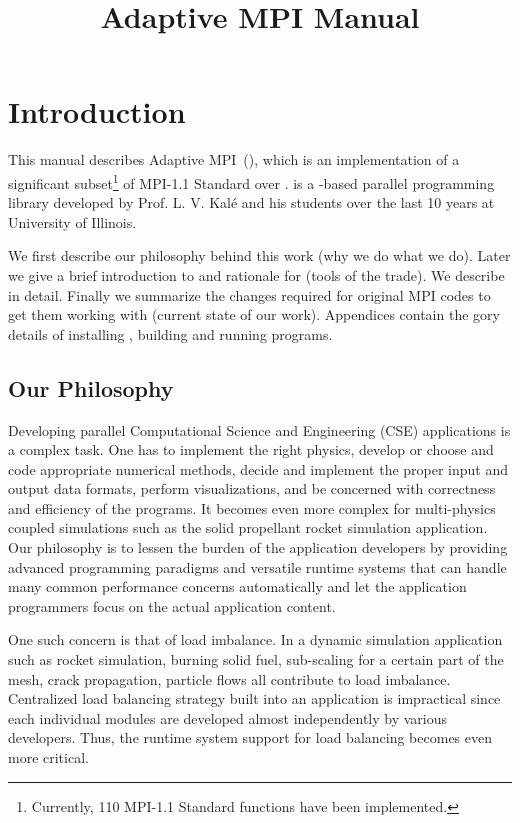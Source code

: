 \documentclass[10pt]{article}
\title{Adaptive MPI Manual}
\begin{document}
\maketitle

\section{Introduction}

This manual describes Adaptive MPI~(\ampi{}), which is an implementation of a
significant subset\footnote{Currently, 110 MPI-1.1 Standard functions have 
been implemented.} of MPI-1.1 Standard over \charmpp{}. \charmpp{} is a
\CC{}-based parallel programming library developed by Prof. L. V. Kal\'{e} 
and his students over the last 10 years at University of Illinois.

We first describe our philosophy behind this work (why we do what we do).
Later we give a brief introduction to \charmpp{} and rationale for \ampi{}
(tools of the trade). We describe \ampi{} in detail. Finally we summarize the
changes required for original MPI codes to get them working with \ampi{}
(current state of our work). Appendices contain the gory details of installing
\ampi{}, building and running \ampi{} programs.

\subsection{Our Philosophy}

Developing parallel Computational Science and Engineering (CSE) applications is
a complex task. One has to implement the right physics, develop or choose and
code appropriate numerical methods, decide and implement the proper input and
output data formats, perform visualizations, and be concerned with correctness
and efficiency of the programs. It becomes even more complex for multi-physics
coupled simulations such as the solid propellant rocket simulation application.  
Our philosophy is to lessen the burden of the application developers by
providing advanced programming paradigms and versatile runtime systems that can
handle many common performance concerns automatically and let the application
programmers focus on the actual application content.

One such concern is that of load imbalance. In a dynamic simulation application
such as rocket simulation, burning  solid fuel, sub-scaling for a certain part
of the mesh, crack propagation, particle flows all contribute to load
imbalance. Centralized load balancing strategy built into an application is
impractical since each individual modules are developed almost independently by
various developers. Thus, the runtime system support for load balancing becomes
even more critical.
\end{document}
